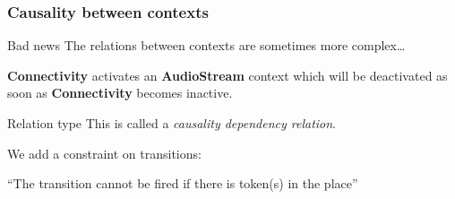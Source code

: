 \documentclass{beamer}
\begin{document}
\begin{frame}
	\frametitle{Causality between contexts}

	\begin{alertblock}{Bad news}
		The relations between contexts are sometimes more complex\ldots
	\end{alertblock}
	\bigskip


	\textbf{Connectivity} activates an \textbf{AudioStream}
	context which will be deactivated as soon as \textbf{Connectivity} becomes inactive.
	\bigskip

	\begin{exampleblock}{Relation type}
		This is called a \textit{causality dependency relation}.
	\end{exampleblock}

	We add a constraint on transitions:

	\begin{figure}[!ht]
	\end{figure}

	\begin{center}
		\enquote{The transition cannot be fired if there is token(s) in the place}
	\end{center}
\end{frame}






















\end{document}
